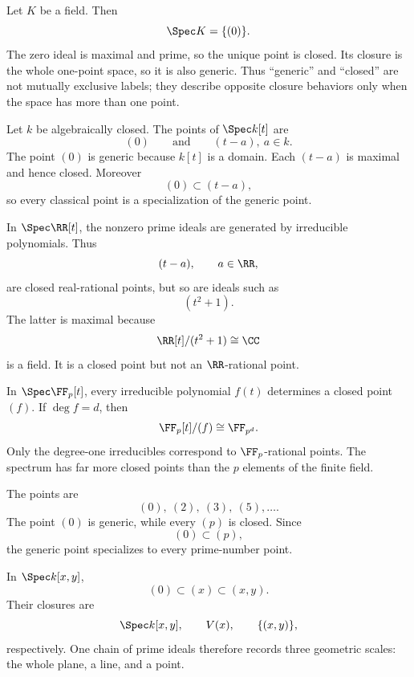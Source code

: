 \begin{example}
Let $K$ be a field.  Then
\[
\Spec K=\{(0)\}.
\]
The zero ideal is maximal and prime, so the unique point is closed.  Its closure is the
whole one-point space, so it is also generic.  Thus ``generic'' and ``closed'' are not
mutually exclusive labels; they describe opposite closure behaviors only when the space
has more than one point.
\end{example}

\begin{example}
Let $k$ be algebraically closed.  The points of $\Spec k[t]$ are
\[
(0)
\qquad\text{and}\qquad
(t-a),\ a\in k.
\]
The point $(0)$ is generic because $k[t]$ is a domain.  Each $(t-a)$ is maximal and hence
closed.  Moreover
\[
(0)\subset(t-a),
\]
so every classical point is a specialization of the generic point.
\end{example}

\begin{example}
In $\Spec\RR[t]$, the nonzero prime ideals are generated by irreducible polynomials.  Thus
\[
(t-a),\qquad a\in\RR,
\]
are closed real-rational points, but so are ideals such as
\[
(t^2+1).
\]
The latter is maximal because
\[
\RR[t]/(t^2+1)\cong\CC
\]
is a field.  It is a closed point but not an $\RR$-rational point.
\end{example}

\begin{example}
In $\Spec\FF_p[t]$, every irreducible polynomial $f(t)$ determines a closed point $(f)$.
If $\deg f=d$, then
\[
\FF_p[t]/(f)\cong\FF_{p^d}.
\]
Only the degree-one irreducibles correspond to $\FF_p$-rational points.  The spectrum has
far more closed points than the $p$ elements of the finite field.
\end{example}

\begin{example}
The points are
\[
(0),\ (2),\ (3),\ (5),\ldots.
\]
The point $(0)$ is generic, while every $(p)$ is closed.  Since
\[
(0)\subset(p),
\]
the generic point specializes to every prime-number point.
\end{example}

\begin{example}
In $\Spec k[x,y]$,
\[
(0)\subset(x)\subset(x,y).
\]
Their closures are
\[
\Spec k[x,y],\qquad V(x),\qquad \{(x,y)\},
\]
respectively.  One chain of prime ideals therefore records three geometric scales:
the whole plane, a line, and a point.
\end{example}

